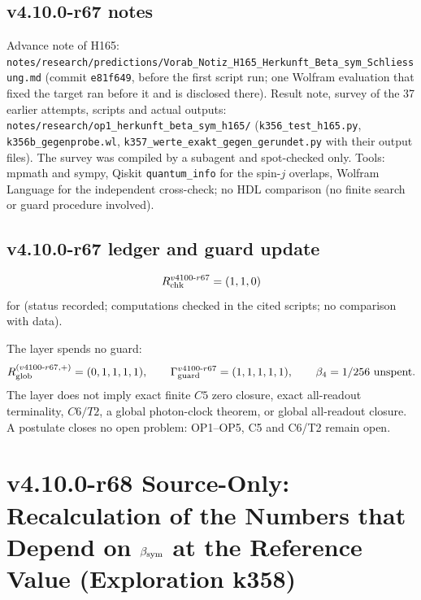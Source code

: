 \subsection*{v4.10.0-r67 notes}
\label{subsec:v4100-r67-notes}

{\raggedright
Advance note of H165: \texttt{notes/\allowbreak research/\allowbreak predictions/\allowbreak Vorab\_\allowbreak Notiz\_\allowbreak H165\_\allowbreak Herkunft\_\allowbreak Beta\_\allowbreak sym\_\allowbreak Schliessung.md}
(commit \texttt{e81f649}, before the first script run; one Wolfram evaluation that fixed the target ran before it and is disclosed there).
Result note, survey of the 37 earlier attempts, scripts and actual outputs:
\texttt{notes/\allowbreak research/\allowbreak op1\_\allowbreak herkunft\_\allowbreak beta\_\allowbreak sym\_\allowbreak h165/}
(\texttt{k356\_\allowbreak test\_\allowbreak h165.py}, \texttt{k356b\_\allowbreak gegenprobe.wl}, \texttt{k357\_\allowbreak werte\_\allowbreak exakt\_\allowbreak gegen\_\allowbreak gerundet.py} with their output files).
The survey was compiled by a subagent and spot-checked only.
Tools: mpmath and sympy, Qiskit \texttt{quantum\_info} for the spin-\(j\) overlaps, Wolfram Language for the independent cross-check; no HDL
comparison (no finite search or guard procedure involved).
\par}

\subsection*{v4.10.0-r67 ledger and guard update}
\label{subsec:v4100-r67-ledger-guard}

\[
R_{\rm chk}^{v4100\text{-}r67}=(1,1,0)
\]
for (status recorded; computations checked in the cited scripts; no comparison with data).

The layer spends no guard:
\[
R_{\rm glob}^{(v4100\text{-}r67,+)}=(0,1,1,1,1),
\qquad
\Gamma_{\rm guard}^{v4100\text{-}r67}=(1,1,1,1,1),
\qquad
\beta_4=1/256\ \text{unspent}.
\]
The layer does not imply exact finite \(C5\) zero closure, exact all-readout terminality, \(C6/T2\), a global photon-clock theorem,
or global all-readout closure.  A postulate closes no open problem: OP1--OP5, C5 and C6/T2 remain open.

\clearpage
\section*{v4.10.0-r68 Source-Only: Recalculation of the Numbers that Depend on \texorpdfstring{\(\beta_{\rm sym}\)}{beta sym} at the Reference Value (Exploration k358)}
\label{sec:v4100-r68-recalculation}

